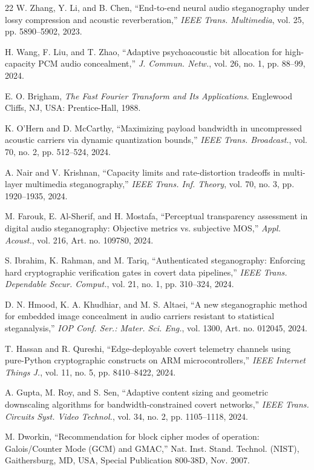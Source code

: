 \documentclass[10pt,conference]{IEEEtran}
\begin{document}
\begin{thebibliography}{22}
W. Zhang, Y. Li, and B. Chen, ``End-to-end neural audio steganography under lossy compression and acoustic reverberation,'' \emph{IEEE Trans. Multimedia}, vol. 25, pp. 5890--5902, 2023.

H. Wang, F. Liu, and T. Zhao, ``Adaptive psychoacoustic bit allocation for high-capacity PCM audio concealment,'' \emph{J. Commun. Netw.}, vol. 26, no. 1, pp. 88--99, 2024.

E. O. Brigham, \emph{The Fast Fourier Transform and Its Applications}. Englewood Cliffs, NJ, USA: Prentice-Hall, 1988.

K. O'Hern and D. McCarthy, ``Maximizing payload bandwidth in uncompressed acoustic carriers via dynamic quantization bounds,'' \emph{IEEE Trans. Broadcast.}, vol. 70, no. 2, pp. 512--524, 2024.

A. Nair and V. Krishnan, ``Capacity limits and rate-distortion tradeoffs in multi-layer multimedia steganography,'' \emph{IEEE Trans. Inf. Theory}, vol. 70, no. 3, pp. 1920--1935, 2024.

M. Farouk, E. Al-Sherif, and H. Mostafa, ``Perceptual transparency assessment in digital audio steganography: Objective metrics vs. subjective MOS,'' \emph{Appl. Acoust.}, vol. 216, Art. no. 109780, 2024.

S. Ibrahim, K. Rahman, and M. Tariq, ``Authenticated steganography: Enforcing hard cryptographic verification gates in covert data pipelines,'' \emph{IEEE Trans. Dependable Secur. Comput.}, vol. 21, no. 1, pp. 310--324, 2024.

D. N. Hmood, K. A. Khudhiar, and M. S. Altaei, ``A new steganographic method for embedded image concealment in audio carriers resistant to statistical steganalysis,'' \emph{IOP Conf. Ser.: Mater. Sci. Eng.}, vol. 1300, Art. no. 012045, 2024.

T. Hassan and R. Qureshi, ``Edge-deployable covert telemetry channels using pure-Python cryptographic constructs on ARM microcontrollers,'' \emph{IEEE Internet Things J.}, vol. 11, no. 5, pp. 8410--8422, 2024.

A. Gupta, M. Roy, and S. Sen, ``Adaptive content sizing and geometric downscaling algorithms for bandwidth-constrained covert networks,'' \emph{IEEE Trans. Circuits Syst. Video Technol.}, vol. 34, no. 2, pp. 1105--1118, 2024.

M. Dworkin, ``Recommendation for block cipher modes of operation: Galois/Counter Mode (GCM) and GMAC,'' Nat. Inst. Stand. Technol. (NIST), Gaithersburg, MD, USA, Special Publication 800-38D, Nov. 2007.
\end{thebibliography}
\end{document}
